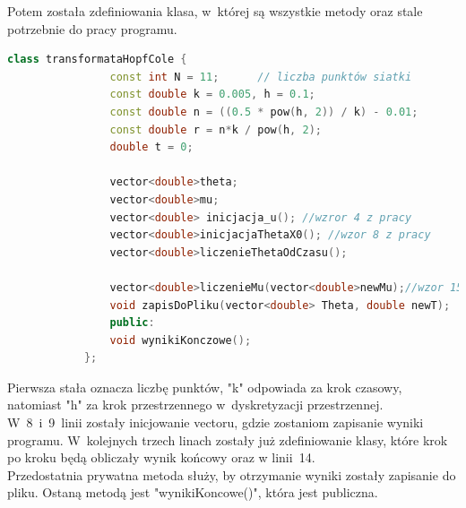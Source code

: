 \documentclass[a4paper,12pt]{article}
\begin{document}
	Potem została zdefiniowania klasa, w~której są wszystkie metody oraz stale potrzebnie do pracy programu.
			\begin{lstlisting}[caption={klasa tranformataHopfCofe},label={klasa}, language=C++]
			class transformataHopfCole {
				const int N = 11;      // liczba punktów siatki
				const double k = 0.005, h = 0.1;
				const double n = ((0.5 * pow(h, 2)) / k) - 0.01;
				const double r = n*k / pow(h, 2);
				double t = 0;
				
				vector<double>theta;
				vector<double>mu;
				vector<double> inicjacja_u(); //wzror 4 z pracy
				vector<double>inicjacjaThetaX0(); //wzor 8 z pracy
				vector<double>liczenieThetaOdCzasu();
				
				vector<double>liczenieMu(vector<double>newMu);//wzor 15
				void zapisDoPliku(vector<double> Theta, double newT);
				public:
				void wynikiKonczowe();
			};\end{lstlisting}
		Pierwsza stała oznacza liczbę punktów, "k" odpowiada za krok czasowy, natomiast "h" za krok przestrzennego w~dyskretyzacji przestrzennej.\\
		W~8~i~9~linii zostały inicjowanie vectoru, gdzie zostaniom zapisanie wyniki programu. W~kolejnych trzech linach zostały już zdefiniowanie klasy, które krok po kroku będą obliczały wynik końcowy oraz w linii~14.\\
		Przedostatnia prywatna metoda służy, by otrzymanie wyniki zostały zapisanie do pliku. Ostaną metodą jest "wynikiKoncowe()", która jest publiczna. 
\end{document}
